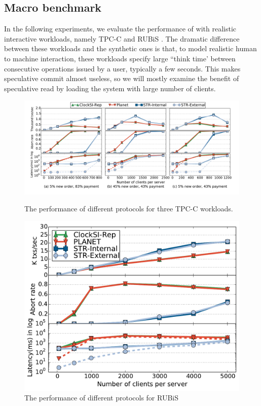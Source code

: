 \subsection{Macro benchmark}
In the following experiments, we evaluate the performance of \specula with realistic interactive workloads, namely TPC-C\cite{tpcc} and RUBiS \cite{rubis}. The dramatic difference between these workloads and the synthetic ones is that, to model realistic human to machine interaction, these workloads specify large ``think time' between consecutive operations issued by a user, typically a few seconds. This makes speculative commit almost useless, so we will mostly examine the benefit of speculative read by loading the system with large number of clients.


\begin{figure}
\centering
\begin{minipage}{.72\textwidth}
\centering
  \includegraphics[scale=0.3]{figures/tpcc}
  \vspace{-5mm}
  \caption{\small The performance of different protocols for three TPC-C workloads.}
  \label{fig:tpcc}
\end{minipage}
\begin{minipage}{.26\textwidth}
\centering
  \includegraphics[scale=0.28]{figures/rubislatencywarehouse}
  \vspace{-2mm}
  \caption{\small The performance of different protocols for RUBiS}
  \label{fig:rubis}
\end{minipage}
\end{figure}

